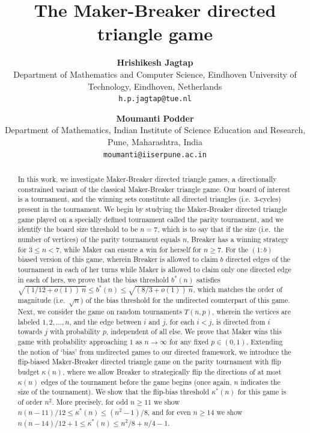 \documentclass{article}
\theoremstyle{definition}
\theoremstyle{plain}
\theoremstyle{remark}
\theoremstyle{definition}
\begin{document}
\title{The Maker-Breaker directed triangle game}
\author{
  \textbf{Hrishikesh Jagtap} \\
  Department of Mathematics and Computer Science, Eindhoven University of Technology, Eindhoven, Netherlands
 \\
  \texttt{h.p.jagtap@tue.nl}
  \and
  \textbf{Moumanti Podder} \\
  Department of Mathematics, Indian Institute of Science Education and Research, Pune, Maharashtra, India
 \\
  \texttt{moumanti@iiserpune.ac.in}
}

\maketitle
\thispagestyle{firstpage}

\begin{abstract}
    In this work, we investigate Maker-Breaker directed triangle games, a directionally constrained variant of the classical Maker-Breaker triangle game. Our board of interest is a tournament, and the winning sets constitute all directed triangles (i.e.\ $3$-cycles) present in the tournament. We begin by studying the Maker-Breaker directed triangle game played on a specially defined tournament called the parity tournament, and we identify the board size threshold to be $n=7$, which is to say that if the size (i.e.\ the number of vertices) of the parity tournament equals $n$, Breaker has a winning strategy for $3\le n< 7$, while Maker can ensure a win for herself for $n\ge 7$. For the $(1:b)$ biased version of this game, wherein Breaker is allowed to claim $b$ directed edges of the tournament in each of her turns while Maker is allowed to claim only one directed edge in each of hers, we prove that the bias threshold $b^*(n)$ satisfies $\sqrt{\left(1/12+o(1)\right)\ n}\le b^{*}(n) \le\sqrt{\left(8/3+o(1)\right)\ n}$, which matches the order of magnitude (i.e.\ $\sqrt{n}$) of the bias threshold for the undirected counterpart of this game. Next, we consider the game on random tournaments $T(n,p)$, wherein the vertices are labeled $1,2,\ldots,n$, and the edge between $i$ and $j$, for each $i<j$, is directed from $i$ towards $j$ with probability $p$, independent of all else. We prove that Maker wins this game with probability approaching $1$ as $n \to \infty$ for any fixed $p \in (0,1)$. Extending the notion of `bias' from undirected games to our directed framework, we introduce the flip-biased Maker-Breaker directed triangle game on the parity tournament with flip budget $\kappa(n)$, where we allow Breaker to strategically flip the directions of at most $\kappa(n)$ edges of the tournament before the game begins (once again, $n$ indicates the size of the tournament). We show that the flip-bias threshold $\kappa^*(n)$ for this game is of order $n^2$. More precisely, for odd $n\ge 11$ we show $n(n-11)/12 \le \kappa^*(n) \le (n^2-1)/8$, and for even $n \ge 14$ we show $n(n-14)/12 + 1\le \kappa^*(n) \le n^2/8+ n/4-1$.
\end{abstract}
\end{document}
